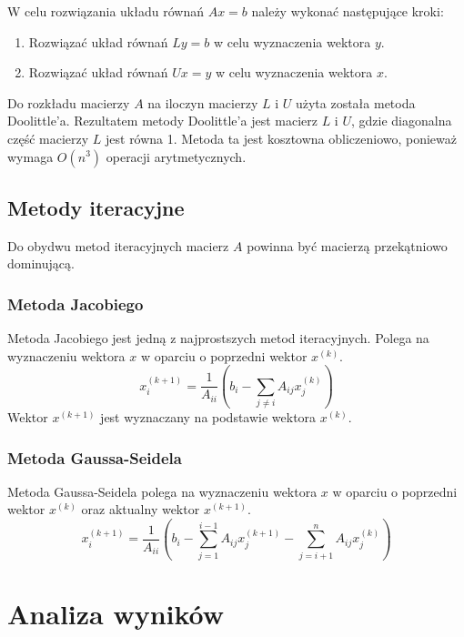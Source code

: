 \documentclass[a4paper,12pt]{article}  %
\begin{document}
W celu rozwiązania układu równań $Ax = b$ należy wykonać następujące kroki:
\begin{enumerate}
    \item Rozwiązać układ równań $Ly = b$ w celu wyznaczenia wektora $y$.
    \item Rozwiązać układ równań $Ux = y$ w celu wyznaczenia wektora $x$.
\end{enumerate}
Do rozkładu macierzy $A$ na iloczyn macierzy $L$ i $U$ użyta została
metoda Doolittle'a. Rezultatem metody Doolittle'a jest macierz $L$ i $U$,
gdzie diagonalna część macierzy $L$ jest równa 1. Metoda ta jest kosztowna
obliczeniowo, ponieważ wymaga $O(n^3)$ operacji arytmetycznych.
\subsection{Metody iteracyjne}
Do obydwu metod iteracyjnych macierz $A$ powinna być macierzą
przekątniowo dominującą.
\subsubsection{Metoda Jacobiego}
Metoda Jacobiego jest jedną z najprostszych metod iteracyjnych. Polega na
wyznaczeniu wektora $x$ w oparciu o poprzedni wektor $x^{(k)}$.
\begin{equation}
    x^{(k+1)}_i = \frac{1}{A_{ii}} \left( b_i - \sum_{j \neq i} A_{ij} x^{(k)}_j \right)
\end{equation}
Wektor $x^{(k+1)}$ jest wyznaczany na podstawie wektora $x^{(k)}$.

\subsubsection{Metoda Gaussa-Seidela}
Metoda Gaussa-Seidela polega na wyznaczeniu wektora $x$ w oparciu o
poprzedni wektor $x^{(k)}$ oraz aktualny wektor $x^{(k+1)}$.
\begin{equation}
  x^{(k+1)}_i = \frac{1}{A_{ii}} \left( b_i - \sum_{j = 1}^{i-1} A_{ij}
  x^{(k+1)}_j - \sum_{j = i+1}^{n} A_{ij} x^{(k)}_j \right)
\end{equation}

\section{Analiza wyników}
\end{document}
